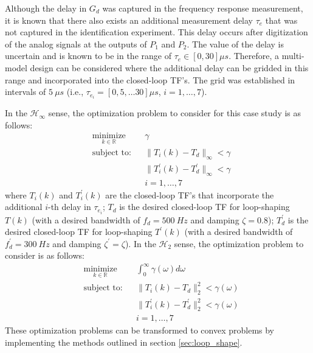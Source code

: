 \documentclass[a4paper, 10pt, conference]{ieeeconf}
\begin{document}
Although the delay in $G_d$ was captured in the frequency response measurement, it is known that there also exists an additional measurement delay $\tau_e$ that was not captured in the identification experiment. This delay occurs after digitization of the analog signals at the outputs of $P_1$ and $P_2$. The value of the delay is uncertain and is known to be in the range of $\tau_e \in [0,30]\mu s$. Therefore, a multi-model design can be considered where the additional delay can be gridded in this range and incorporated into the closed-loop TF's. The grid was established in intervals of $5 \: \mu s$ (i.e., $\tau_{e_i} = [0,5,\ldots30] \mu s$, $i = 1,\ldots,7$).  

In the $\mathcal{H}_{\infty}$ sense, the optimization problem to consider for this case study is as follows:
 \begin{equation} \label{eq:case_study_opt}
\begin{aligned}
& \underset{ k \in \mathbb{R}}{\text{minimize}}
& & \gamma  \\
& \text{subject to:} & & \|T_i(k)-T_d\|_{\infty}< \gamma \\
& &  &\|T_i^{\prime}(k)-T_d^{\prime}\|_{\infty}< \gamma \\ 
& & & i = 1,\ldots,7
\end{aligned}
\end{equation}
where $T_i(k)$ and $T_i^{\prime}(k)$ are the closed-loop TF's that incorporate the additional $i$-th delay in $\tau_{e_i}$; $T_d$ is the desired closed-loop TF for loop-shaping $T(k)$ (with a desired bandwidth of $f_d = 500 \: Hz$ and damping $\zeta = 0.8$); $T_d^{\prime}$ is the desired closed-loop TF for loop-shaping $T^{\prime}(k)$ (with a desired bandwidth of $f_d^{\prime} = 300 \: Hz$ and damping $\zeta^{\prime} = \zeta$). In the $\mathcal{H}_2$ sense, the optimization problem to consider is as follows:
\begin{equation} \label{eq:case_study_opt_2}
\begin{aligned}
& \underset{ k \in \mathbb{R}}{\text{minimize}}
& & \int_0^{\infty} \gamma(\omega) d\omega  \\
& \text{subject to:} & & \|T_i(k)-T_d\|_2^2< \gamma(\omega) \\
& &  &\|T_i^{\prime}(k)-T_d^{\prime}\|_2^2< \gamma(\omega) \\ 
& & & i = 1,\ldots,7
\end{aligned}
\end{equation}
These optimization problems can be transformed to convex problems by implementing the methods outlined in section \ref{sec:loop_shape}. 
\end{document}
